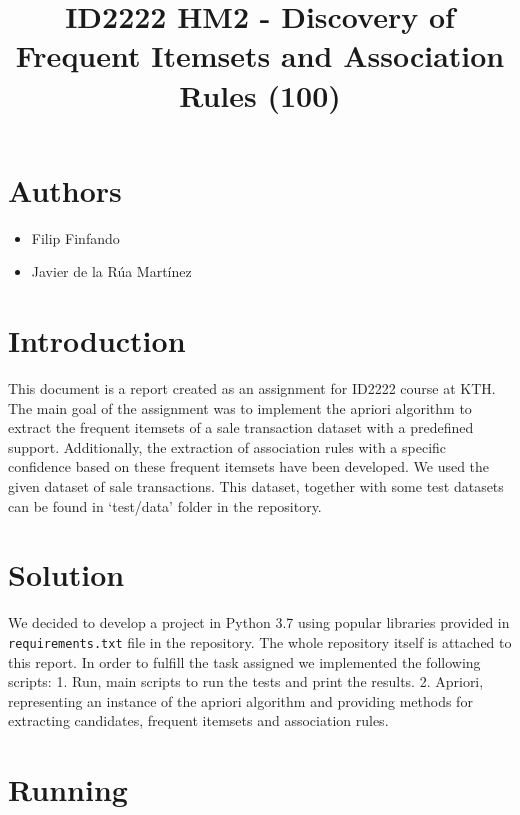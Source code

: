\documentclass[11pt]{article}
\title{ID2222 HM2 - Discovery of Frequent Itemsets and Association Rules (100)}
\providecommand{\tightlist}{%
      \setlength{\itemsep}{0pt}\setlength{\parskip}{0pt}}
\begin{document}
    
    
    \maketitle
    
    

    
    \hypertarget{authors}{%
\section{Authors}\label{authors}}

\begin{itemize}
\tightlist
\item
  Filip Finfando
\item
  Javier de la Rúa Martínez
\end{itemize}

    \hypertarget{introduction}{%
\section{Introduction}\label{introduction}}

This document is a report created as an assignment for ID2222 course at
KTH. The main goal of the assignment was to implement the apriori
algorithm to extract the frequent itemsets of a sale transaction dataset
with a predefined support. Additionally, the extraction of association
rules with a specific confidence based on these frequent itemsets have
been developed. We used the given dataset of sale transactions. This
dataset, together with some test datasets can be found in `test/data'
folder in the repository.

    \hypertarget{solution}{%
\section{Solution}\label{solution}}

We decided to develop a project in Python 3.7 using popular libraries
provided in \texttt{requirements.txt} file in the repository. The whole
repository itself is attached to this report. In order to fulfill the
task assigned we implemented the following scripts: 1. Run, main scripts
to run the tests and print the results. 2. Apriori, representing an
instance of the apriori algorithm and providing methods for extracting
candidates, frequent itemsets and association rules.

    \hypertarget{running}{%
\section{Running}\label{running}}
\end{document}
